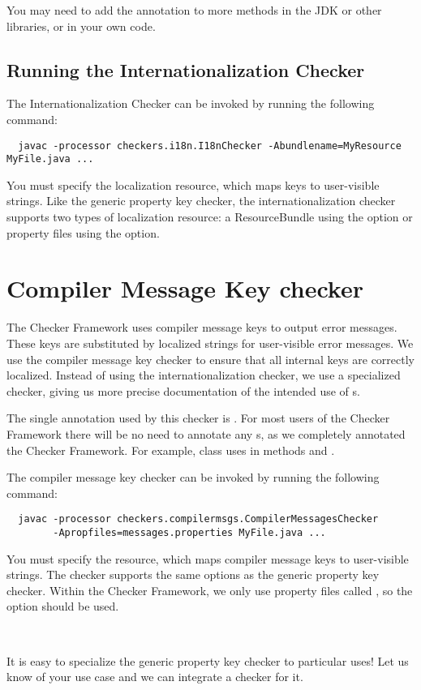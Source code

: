 You may need to add the  annotation to more methods in the
JDK or other libraries, or in your own code.


\subsection{Running the Internationalization Checker\label{i18n-running}}

The Internationalization Checker can be invoked by running the following
command:

\begin{Verbatim}
  javac -processor checkers.i18n.I18nChecker -Abundlename=MyResource MyFile.java ...
\end{Verbatim}

You must specify the localization resource, which maps keys to user-visible
strings.  Like the generic property key checker, the internationalization checker
supports two types of localization resource:
a ResourceBundle using the 
 option
or property files using the
 option.



\section{Compiler Message Key checker\label{compilermsgs-checker}}

The Checker Framework uses compiler message keys to output error messages.
These keys are substituted by localized strings for user-visible error messages.
We use the compiler message key checker to ensure that all internal keys are
correctly localized.
Instead of using the internationalization checker, we use a specialized checker,
giving us more precise documentation of the intended use of s.

The single annotation used by this checker is 
.
For most users of the Checker Framework there will be no need to annotate any
s, as we completely annotated the Checker Framework.
For example, class  uses 
in methods  and .

The compiler message key checker can be invoked by running the following
command:

\begin{Verbatim}
  javac -processor checkers.compilermsgs.CompilerMessagesChecker
        -Apropfiles=messages.properties MyFile.java ...
\end{Verbatim}

You must specify the resource, which maps compiler message keys to user-visible
strings.  The checker supports the same options as the generic property key checker.
Within the Checker Framework, we only use property files called ,
so the  option should be used.

~

It is easy to specialize the generic property key checker to particular uses!
Let us know of your use case and we can integrate a checker for it.

